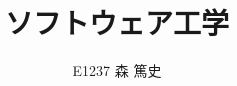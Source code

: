 \documentclass[a4j]{jarticle}
\begin{document}
\title{ソフトウェア工学}

\author{E1237 森 篤史}


\maketitle
\thispagestyle{empty}


\section{}
\end{document}
